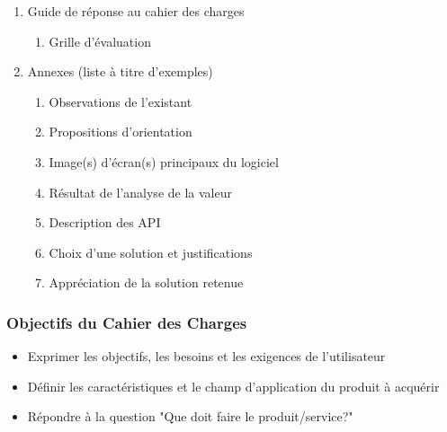 {{\begin{enumerate}
\begin{enumerate}
          \item Stabilité de la configuration
          \item (Description des API)
        \end{enumerate} 
      \item  Guide de réponse au cahier des charges
        \begin{enumerate}
          \item Grille d'évaluation
        \end{enumerate} 
      \item  Annexes (liste à titre d'exemples)
        \begin{enumerate}
          \item Observations de l'existant
          \item Propositions d'orientation
          \item Image(s) d'écran(s) principaux du logiciel
          \item Résultat de l'analyse de la valeur
          \item Description des API
          \item Choix d'une solution et justifications
          \item Appréciation de la solution retenue 
        \end{enumerate}         
        
      \end{enumerate}
        }
       
        \doitemsep
\subsubsection{Objectifs du Cahier des Charges}
  \begin{itemize}
    \item Exprimer les objectifs, les besoins et les exigences de l'utilisateur
    \item Définir les caractéristiques et le champ d'application du produit à acquérir
    \item Répondre à la question "Que doit faire le produit/service?"
  \end{itemize}
}
